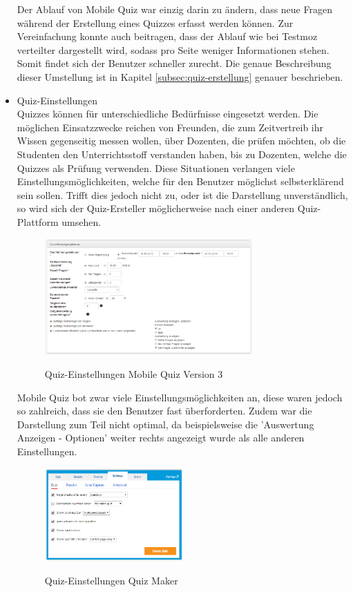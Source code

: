 \begin{itemize}
		Der Ablauf von Mobile Quiz war einzig darin zu ändern, dass neue Fragen während der Erstellung eines Quizzes erfasst werden können. Zur Vereinfachung konnte auch beitragen, dass der Ablauf wie bei Testmoz \cite{testmoz.com} verteilter dargestellt wird, sodass pro Seite weniger Informationen stehen. Somit findet sich der Benutzer schneller zurecht. Die genaue Beschreibung dieser Umstellung ist in Kapitel \ref{subsec:quiz-erstellung} genauer beschrieben.
		
		
		
		
		\item  Quiz-Einstellungen \\
		Quizzes können für unterschiedliche Bedürfnisse eingesetzt werden. Die möglichen Einsatzzwecke reichen von Freunden, die zum Zeitvertreib ihr Wissen gegenseitig messen wollen, über Dozenten, die prüfen möchten, ob die Studenten den Unterrichtsstoff verstanden haben, bis zu Dozenten, welche die Quizzes als Prüfung verwenden.
		Diese Situationen verlangen viele Einstellungsmöglichkeiten, welche für den Benutzer möglichst selbsterklärend sein sollen. Trifft dies jedoch nicht zu, oder ist die Darstellung unverständlich, so wird sich der Quiz-Ersteller möglicherweise nach einer anderen Quiz-Plattform umsehen.
		
		\begin{figure}[H]
			\centering
			\includegraphics[width=0.75\textwidth
			]{Images/MobileQuiz_Quiz-Settings.PNG}
			\caption{Quiz-Einstellungen Mobile Quiz Version 3}
			\cite{mobilequiz.ch}
		\end{figure}
		
		
		Mobile Quiz bot zwar viele Einstellungsmöglichkeiten an, diese waren jedoch so zahlreich, dass sie den Benutzer fast überforderten. Zudem war die Darstellung zum Teil nicht optimal, da beispielsweise die 'Auswertung Anzeigen - Optionen' weiter rechts angezeigt wurde als alle anderen Einstellungen.
		
		\begin{figure}[H]
			\centering
			\includegraphics[width=0.5\textwidth
			]{Images/QuizMaker_Quiz-Settings.PNG}
			\caption{Quiz-Einstellungen Quiz Maker}
			\cite{quiz-maker}
		\end{figure}
		

\end{itemize}
